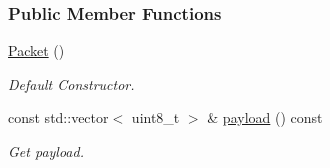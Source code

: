 \subsubsection*{Public Member Functions}
\begin{DoxyCompactItemize}
\item 
\mbox{\label{classosse_1_1collaborate_1_1_packet_aecb3018048e1845ea9e45dcd008cc0df}} 
\hyperlink{classosse_1_1collaborate_1_1_packet_aecb3018048e1845ea9e45dcd008cc0df}{Packet} ()
\begin{DoxyCompactList}\small\item\em Default Constructor. \end{DoxyCompactList}\item 
const std\+::vector$<$ uint8\+\_\+t $>$ \& \hyperlink{classosse_1_1collaborate_1_1_packet_a6034dd26382166bf4feeed7cecda3e54}{payload} () const
\begin{DoxyCompactList}\small\item\em Get payload. \end{DoxyCompactList}\end{DoxyCompactItemize}
